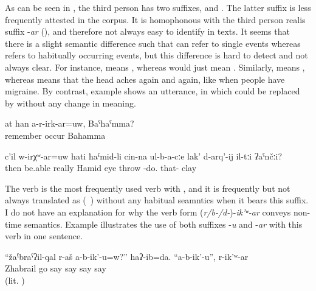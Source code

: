 As can be seen in , the third person has two suffixes,  and . The latter suffix is less frequently attested in the corpus. It is homophonous with the third person realis  suffix -\textit{ar} (), and therefore not always easy to identify in texts. It seems that there is a slight semantic difference such that  can refer to single events whereas  refers to habitually occurring events, but this difference is hard to detect and not always clear. For instance,  means , whereas  would just mean . Similarly,  means , whereas  means that the head aches again and again, like when people have migraine.
By contrast, example  shows an utterance, in which  could be replaced by  without any change in meaning.  
\begin{exe}
	\ex	\label{ex:Don't you remember her, Bahamma}
	\gll	at	han	a-r-irk-ar=uw,	Baˁħaˁmma?	\\
			remember	occur		Bahamma\\
	\glt	{}
	
	\ex	\label{ex:Can Hamid really throw clay into his eyes}
	\gll	c'il	w-irχʷ-ar=uw	hati	ħaˁmid-li	cin-na	ul-b-a-cːe	lak'	d-arq'-ij	il-tːi	ʡaˁnčːi?\\
		then	be.able	really	Hamid		eye	throw	-do.	that-	clay\\
	\glt	{}
\end{exe}

The verb   is the most frequently used verb with , and it is frequently but not always translated as  (\tie\ ) without any habitual seamntics  when it bears this suffix. I do not have an explanation for why the verb form (\textit{r/b-/d-})-\textit{ik'ʷ-ar} conveys non- time semantics. Example  illustrates the use of both suffixes -\textit{u} and -\textit{ar} with this verb in one sentence. 

\begin{exe}
	\ex	\label{ex:Zhabrail and his family do not invite you}
	\gll	``žaˁbraˁʔil-qal	r-aš	a-b-ik'-u=w?''	haʔ-ib=da.	``a-b-ik'-u'',	r-ik'ʷ-ar\\
		Zhabrail	go	say	say	say	say\\
	\glt	{} (lit. )
\end{exe}


